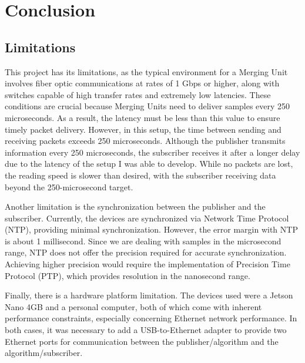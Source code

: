 
\chapter{Conclusion} %

\label{chap:Chapter7} %

\section{Limitations}

This project has its limitations, as the typical environment for a Merging Unit involves fiber optic communications at rates of 1 Gbps or higher, along with switches capable of high transfer rates and extremely low latencies. These conditions are crucial because Merging Units need to deliver samples every 250 microseconds. As a result, the latency must be less than this value to ensure timely packet delivery. However, in this setup, the time between sending and receiving packets exceeds 250 microseconds. Although the publisher transmits information every 250 microseconds, the subscriber receives it after a longer delay due to the latency of the setup I was able to develop. While no packets are lost, the reading speed is slower than desired, with the subscriber receiving data beyond the 250-microsecond target.

Another limitation is the synchronization between the publisher and the subscriber. Currently, the devices are synchronized via Network Time Protocol (NTP), providing minimal synchronization. However, the error margin with NTP is about 1 millisecond. Since we are dealing with samples in the microsecond range, NTP does not offer the precision required for accurate synchronization. Achieving higher precision would require the implementation of Precision Time Protocol (PTP), which provides resolution in the nanosecond range.

Finally, there is a hardware platform limitation. The devices used were a Jetson Nano 4GB and a personal computer, both of which come with inherent performance constraints, especially concerning Ethernet network performance. In both cases, it was necessary to add a USB-to-Ethernet adapter to provide two Ethernet ports for communication between the publisher/algorithm and the algorithm/subscriber.



